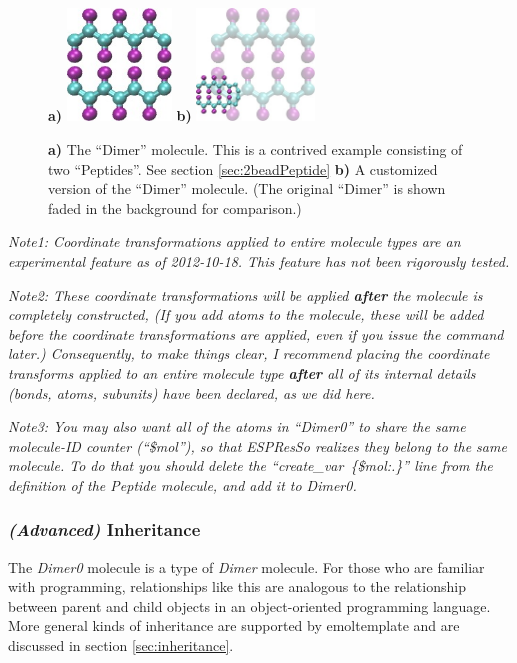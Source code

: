 \documentclass[11pt]{article}
\begin{document}
\begin{figure}[htbp]
\centering
\textbf{a)}
\includegraphics[height=3cm]{dimer_LR.jpg}
\hspace{1cm}
\textbf{b)}
\includegraphics[height=3cm]{dimer+dimer0_transparent_LR.jpg}
\caption{
\label{fig:dimers}
\textbf{a)}
The ``Dimer'' molecule.  This is a contrived example consisting of
two ``Peptides''.  See section \ref{sec:2beadPeptide}
\textbf{b)}
A customized version of the ``Dimer'' molecule.  
(The original ``Dimer'' is shown faded in the background for comparison.)
}
\end{figure}

\textit{Note1: Coordinate transformations applied to entire
molecule types are an experimental feature as of 2012-10-18.
This feature has not been rigorously tested.}

\textit{Note2: These coordinate transformations will be 
applied \textbf{after} the molecule is completely constructed,
(If you add atoms to the molecule, these will be added before
the coordinate transformations are applied,
even if you issue the command later.)
Consequently, to make things clear, 
I recommend placing the coordinate transforms applied to 
an entire molecule type \textbf{after} all of its internal details 
(bonds, atoms, subunits) have been declared, as we did here.}

\textit{Note3: You may also want all of the atoms in ``Dimer0'' to share the 
 same molecule-ID counter (``\$mol''), so that ESPResSo realizes they belong to 
 the same molecule.  To do that you should delete the 
 \mbox{\textit{``create\_var \{\$mol:.\}''}} line from
 the definition of the Peptide molecule, and add it to \textit{Dimer0}.}

\subsubsection*{\textit{(Advanced)} Inheritance}
\label{sec:inheritance_intro}
The \textit{Dimer0} molecule is a type of \textit{Dimer} molecule.
For those who are familiar with programming, 
relationships like this are analogous to the relationship 
between parent and child objects in an object-oriented programming language.
More general kinds of inheritance are supported by emoltemplate
and are discussed in section \ref{sec:inheritance}.
\end{document}
